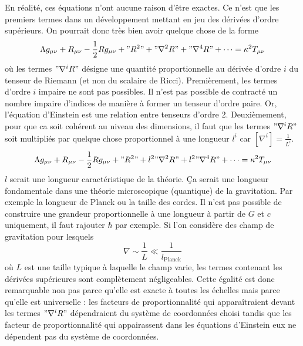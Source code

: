 \documentclass[a4paper,11pt]{report}
\begin{document}
            En réalité, ces équations n'ont aucune raison d'être exactes. Ce n'est que les premiers termes dans un développement mettant en jeu des dérivées d'ordre supérieurs. On pourrait donc très bien avoir quelque chose de la forme
            \begin{equation}
                \Lambda g_{\mu\nu} + R_{\mu\nu} - \frac{1}{2}Rg_{\mu\nu} + "R^2" + "\nabla^2R" + "\nabla^4 R"+\dots = \kappa^2 T_{\mu\nu}
            \end{equation}
            où les termes $"\nabla^iR"$ désigne une quantité proportionnelle au dérivée d'ordre $i$ du tenseur de Riemann (et non du scalaire de Ricci). Premièrement, les termes d'ordre $i$ impaire ne sont pas possibles. Il n'est pas possible de contracté un nombre impaire d'indices de manière à former un tenseur d'ordre paire. Or, l'équation d'Einstein est une relation entre tenseurs d'ordre 2. Deuxièmement, pour que ca soit cohérent au niveau des dimensions, il faut que les termes $"\nabla^i R"$ soit multipliés par quelque chose proportionnel à une longueur $l^i$ car $[\nabla^i]=\frac{1}{L^i}$.
            \begin{equation}
                \Lambda g_{\mu\nu} + R_{\mu\nu} - \frac{1}{2}Rg_{\mu\nu} + "R^2" + l^2"\nabla^2R" + l^2"\nabla^4 R"+\dots = \kappa^2 T_{\mu\nu}
            \end{equation}
            $l$ serait une longueur caractéristique de la théorie. Ça serait une longueur fondamentale dans une théorie microscopique (quantique) de la gravitation. Par exemple la longueur de Planck ou la taille des cordes. Il n'est pas possible de construire une grandeur proportionnelle à une longueur à partir de $G$ et $c$ uniquement, il faut rajouter $\hbar$ par exemple. Si l'on considère des champ de gravitation pour lesquels
            \begin{equation}
                \nabla\sim\frac{1}{L}\ll \frac{1}{l_{\text{Planck}}}
            \end{equation}
            où $L$ est une taille typique à laquelle le champ varie, les termes contenant les dérivées supérieures sont complètement négligeables. Cette égalité est donc remarquable non pas parce qu'elle est exacte à toutes les échelles mais parce qu'elle est universelle : les facteurs de proportionnalité qui apparaîtraient devant les termes $"\nabla^iR"$ dépendraient du système de coordonnées choisi tandis que les facteur de proportionnalité qui appairassent dans les équations d'Einstein eux ne dépendent pas du système de coordonnées.\\
            
\end{document}
